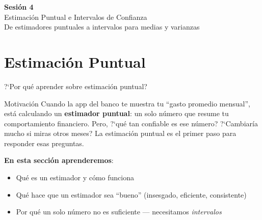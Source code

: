 \documentclass[aspectratio=169, 11pt]{beamer}
\begin{document}
\begin{frame}{}
\vfill
\centering
{\Large\textbf{Sesi\'on 4}}\\[1em]
{\normalsize Estimaci\'on Puntual e Intervalos de Confianza}\\[0.5em]
{\small De estimadores puntuales a intervalos para medias y varianzas}
\vfill
\end{frame}

\section{Estimación Puntual}

\begin{frame}{?`Por qu\'e aprender sobre estimaci\'on puntual?}
\begin{exampleblock}{Motivaci\'on}
Cuando la app del banco te muestra tu ``gasto promedio mensual'', est\'a calculando un \textbf{estimador puntual}: un solo n\'umero que resume tu comportamiento financiero. Pero, ?`qu\'e tan confiable es ese n\'umero? ?`Cambiar\'ia mucho si miras otros meses? La estimaci\'on puntual es el primer paso para responder esas preguntas.
\end{exampleblock}

\textbf{En esta secci\'on aprenderemos}:
\begin{itemize}\setlength{\itemsep}{1pt}
  \item Qu\'e es un estimador y c\'omo funciona
  \item Qu\'e hace que un estimador sea ``bueno'' (insesgado, eficiente, consistente)
  \item Por qu\'e un solo n\'umero no es suficiente --- necesitamos \emph{intervalos}
\end{itemize}
\end{frame}
\end{document}
